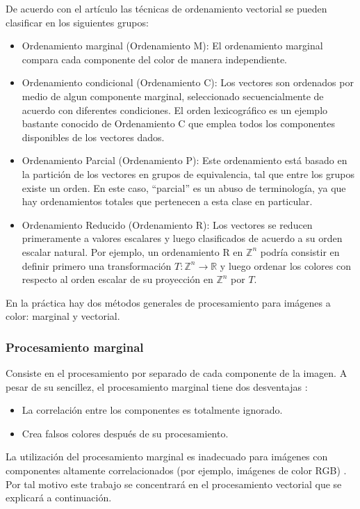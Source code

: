 De acuerdo con el art\'iculo \cite{barnett1976ordering} las t\'ecnicas de ordenamiento vectorial se pueden clasificar en los siguientes grupos:
\begin{itemize}
\item Ordenamiento marginal (Ordenamiento M): El ordenamiento marginal compara cada componente del color de manera independiente.
\item Ordenamiento condicional (Ordenamiento C): Los vectores son ordenados por medio de algun componente marginal, seleccionado secuencialmente de acuerdo con diferentes condiciones. El orden lexicogr\'afico es un ejemplo bastante conocido de Ordenamiento C que emplea todos los componentes disponibles de los vectores dados.
\item Ordenamiento Parcial (Ordenamiento P): Este ordenamiento est\'a basado en la partici\'on de los vectores en grupos de equivalencia, tal que entre los grupos existe un orden. En este caso, ``parcial'' es un abuso de terminolog\'ia, ya que hay ordenamientos totales que pertenecen a esta clase en particular. 
\item Ordenamiento Reducido (Ordenamiento R): Los vectores se reducen primeramente a valores escalares y luego clasificados de acuerdo a su orden escalar natural. Por ejemplo, un ordenamiento R en $\mathbb{Z}^n$ podr\'ia consistir en definir primero una transformaci\'on $T:\mathbb{Z}^n\rightarrow \mathbb{R}$ y luego ordenar los colores con respecto al orden escalar de su proyecci\'on en $\mathbb{Z}^n$ por $T$.
\end{itemize}



 En la pr\'actica hay dos m\'etodos generales de procesamiento para im\'agenes a color: marginal y vectorial.

\subsubsection{Procesamiento marginal}
Consiste en el procesamiento por separado de cada componente de la imagen. A pesar de su sencillez, el procesamiento marginal tiene dos desventajas \cite{aptoula2007comparative}: 
\begin{itemize}
    \item La correlaci\'on entre los componentes es totalmente ignorado.
    \item Crea falsos colores despu\'es de su procesamiento.
\end{itemize}

La utilizaci\'on del procesamiento marginal es inadecuado para im\'agenes con componentes altamente correlacionados (por ejemplo, im\'agenes de color RGB) \cite{astola1990vector}. Por tal motivo este trabajo se concentrar\'a en el procesamiento vectorial que se explicar\'a a continuaci\'on. 

